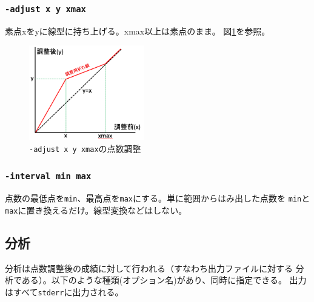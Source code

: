 \subsubsection{\texttt{-adjust x y xmax}}
\label{null-label1}

素点xをyに線型に持ち上げる。xmax以上は素点のまま。
図\ref{fig:adjust}を参照。

\begin{figure}[htbp]
\centering
\includegraphics[keepaspectratio,width=5cm,height=0.75\textheight]{fig/adjust.png}
\caption{\texttt{-adjust x y xmax}の点数調整}
\label{fig:adjust}
\end{figure}

\subsubsection{\texttt{-interval min max}}
\label{null-label2}

点数の最低点を\texttt{min}、最高点を\texttt{max}にする。単に範囲からはみ出した点数を
\texttt{min}と\texttt{max}に置き換えるだけ。線型変換などはしない。

\subsection{分析}
\label{分析}

分析は点数調整後の成績に対して行われる（すなわち出力ファイルに対する
分析である）。以下のような種類(オプション名)があり、同時に指定できる。
出力はすべて\texttt{stderr}に出力される。

